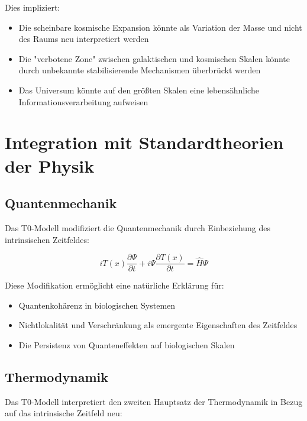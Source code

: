 \documentclass[12pt,a4paper]{article}
\newcommand{\Tfield}{T(x)}
\begin{document}
	Dies impliziert:
	
	\begin{itemize}
		\item Die scheinbare kosmische Expansion könnte als Variation der Masse und nicht des Raums neu interpretiert werden
		\item Die "verbotene Zone" zwischen galaktischen und kosmischen Skalen könnte durch unbekannte stabilisierende Mechanismen überbrückt werden
		\item Das Universum könnte auf den größten Skalen eine lebensähnliche Informationsverarbeitung aufweisen
	\end{itemize}
	
	\section{Integration mit Standardtheorien der Physik}
	\label{sec:integration}
	
	\subsection{Quantenmechanik}
	\label{subsec:quantum_integration}
	
	Das T0-Modell modifiziert die Quantenmechanik durch Einbeziehung des intrinsischen Zeitfeldes:
	
	\begin{equation}
		i\Tfield\frac{\partial \Psi}{\partial t} + i\Psi\frac{\partial \Tfield}{\partial t} = \hat{H}\Psi
	\end{equation}
	
	Diese Modifikation ermöglicht eine natürliche Erklärung für:
	
	\begin{itemize}
		\item Quantenkohärenz in biologischen Systemen
		\item Nichtlokalität und Verschränkung als emergente Eigenschaften des Zeitfeldes
		\item Die Persistenz von Quanteneffekten auf biologischen Skalen
	\end{itemize}
	
	\subsection{Thermodynamik}
	\label{subsec:thermodynamics_integration}
	
	Das T0-Modell interpretiert den zweiten Hauptsatz der Thermodynamik in Bezug auf das intrinsische Zeitfeld neu:
	
\end{document}
